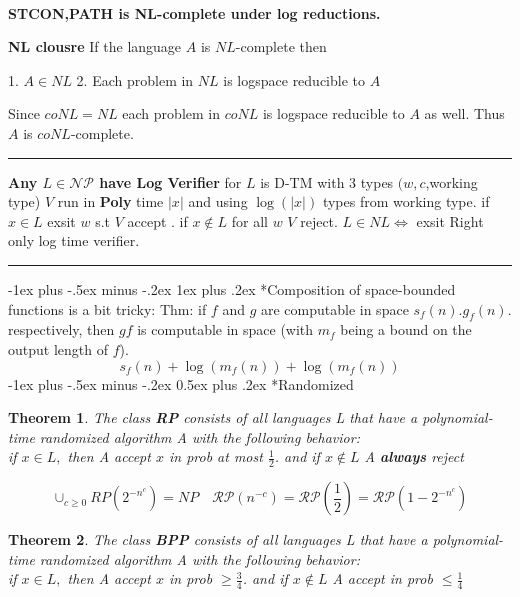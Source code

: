 \documentclass[10pt,landscape]{article}
\makeatletter
\newcommand{\NP}{\mathcal{NP}}
\theoremstyle{plain}%
\newtheorem*{thm}{Theorem}
\theoremstyle{definition}
\theoremstyle{remark}
\renewcommand{\section}{\@startsection{section}{1}{0mm}%
                                {-1ex plus -.5ex minus -.2ex}%
                                {0.5ex plus .2ex}%
                                {\normalfont\large\bfseries}}
\renewcommand{\subsubsection}{\@startsection{subsubsection}{3}{0mm}%
                                {-1ex plus -.5ex minus -.2ex}%
                                {1ex plus .2ex}%
                                {\normalfont\small\bfseries}}
\makeatother
\begin{document}
\begin{multicols}{3}
\[\begin{aligned}
\begin{matrix}
            \end{matrix} \\
    \end{aligned}\]
    \begin{center}
    
 
    \textbf{STCON,PATH is NL-complete under log reductions.}   \end{center}
    \textbf{NL clousre} If the language $A$ is $NL$-complete then 

 1. $A \in NL$
 2. Each problem in $NL$ is logspace reducible to $A$

Since $coNL = NL$ each problem in $coNL$ is logspace reducible to $A$ as well. Thus $A$ is $coNL$-complete. \\
\hrule

\textbf{Any $L\in \NP $ have Log Verifier } for $L$ is D-TM with 3 types $(w,c$,working type) $V$ run in \textbf{Poly} time $|x|$ and using $\log(|x|)$ types from working type. if $x\in L$ exsit $w$ s.t $V $ accept . if $x\notin L$ for all $w$ $V$ reject.
$L\in NL \Leftrightarrow$ exsit Right only log time verifier.\hrule 
\subsubsection*{Composition of space-bounded functions} is a bit tricky:
Thm: if $f$ and $g$ are computable in space $s_f(n).g_f(n).$
respectively, then $g f$ is computable in space (with $m_f$ being a bound on the
output length of $f$).
\[s_f(n)+\log(m_f(n))+\log(m_f(n))
\] 
\section*{Randomized}
\begin{thm}The class \textbf{RP} consists of all languages L that have a polynomial-time randomized
algorithm A with the following behavior: \\
if $x\in L,$ then A accept $x$ in prob at most $\frac{1}{2}$. and if $x\notin L$ A \textbf{always} reject

\end{thm}
\[\cup_{c\ge 0}RP(2^{-n^c})=NP \quad \mathcal{RP}(n^{-c})= \mathcal{RP}(\frac{1}{2})=\mathcal{RP}(1-2^{-n^c})\]
\begin{thm}The class \textbf{BPP} consists of all languages L that have a polynomial-time randomized
algorithm A with the following behavior: \\
if $x\in L,$ then A accept $x$ in prob $\ge \frac{3}{4}$. and if $x\notin L$ A accept in prob $\le \frac{1}{4}$


\end{thm}
\end{multicols}
\end{document}
